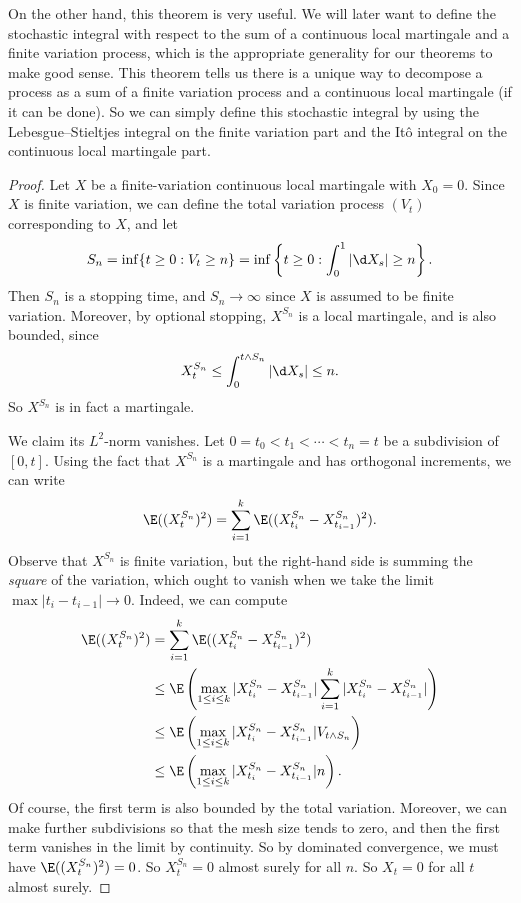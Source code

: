 \documentclass[a4paper]{article}
\begin{document}
On the other hand, this theorem is very useful. We will later want to define the stochastic integral with respect to the sum of a continuous local martingale and a finite variation process, which is the appropriate generality for our theorems to make good sense. This theorem tells us there is a unique way to decompose a process as a sum of a finite variation process and a continuous local martingale (if it can be done). So we can simply define this stochastic integral by using the Lebesgue--Stieltjes integral on the finite variation part and the It\^o integral on the continuous local martingale part.
\begin{proof}
  Let $X$ be a finite-variation continuous local martingale with $X_0 = 0$. Since $X$ is finite variation, we can define the total variation process $(V_t)$ corresponding to $X$, and let
  \[
    S_n = \inf \{t \geq 0: V_t \geq n\} = \inf \left\{t \geq 0: \int_0^1 |\d X_s| \geq n\right\}.
  \]
  Then $S_n$ is a stopping time, and $S_n \to \infty$ since $X$ is assumed to be finite variation. Moreover, by optional stopping, $X^{S_n}$ is a local martingale, and is also bounded, since
  \[
    X_t^{S_n} \leq \int_0^{t \wedge S_n} |\d X_s| \leq n.
  \]
  So $X^{S_n}$ is in fact a martingale.

  We claim its $L^2$-norm vanishes. Let $0 = t_0 < t_1 < \cdots < t_n = t$ be a subdivision of $[0, t]$. Using the fact that $X^{S_n}$ is a martingale and has orthogonal increments, we can write
  \[
    \E((X_t^{S_n})^2) = \sum_{i = 1}^k \E((X_{t_i}^{S_n} - X_{t_{i - 1}}^{S_n})^2).
  \]
  Observe that $X^{S_n}$ is finite variation, but the right-hand side is summing the \emph{square} of the variation, which ought to vanish when we take the limit $\max |t_i - t_{i - 1}| \to 0$. Indeed, we can compute
  \begin{align*}
    \E((X_t^{S_n})^2) &= \sum_{i = 1}^k \E((X_{t_i}^{S_n} - X_{t_{i - 1}}^{S_n})^2)\\
    &\leq \E\left(\max_{1 \leq i \leq k} |X_{t_i}^{S_n} - X_{t_{i - 1}}^{S_n}| \sum_{i =1 }^k |X_{t_i}^{S_n} - X_{t_{i - 1}}^{S_n}|\right)\\
    &\leq \E\left(\max_{1 \leq i \leq k} |X_{t_i}^{S_n} - X_{t_{i - 1}}^{S_n}| V_{t \wedge S_n}\right)\\
    &\leq \E\left(\max_{1 \leq i \leq k} |X_{t_i}^{S_n} - X_{t_{i - 1}}^{S_n}| n\right).
  \end{align*}
  Of course, the first term is also bounded by the total variation. Moreover, we can make further subdivisions so that the mesh size tends to zero, and then the first term vanishes in the limit by continuity. So by dominated convergence, we must have $\E((X_t^{S_n})^2) = 0$. So $X_t^{S_n} = 0$ almost surely for all $n$. So $X_t = 0$ for all $t$ almost surely.
\end{proof}
\end{document}
